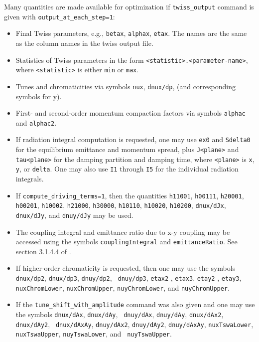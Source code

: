 \documentclass[11pt]{article}
\begin{document}
\begin{itemize}
Many quantities are made available for optimization if \verb|twiss_output| command is given
with \verb|output_at_each_step=1|:
\begin{itemize} 
\item Final Twiss parameters, e.g., \verb|betax|, \verb|alphax|, \verb|etax|.  The names
are the same as the column names in the twiss output file.
\item Statistics of Twiss parameters in the form \verb|<statistic>.<parameter-name>|,
where \verb|<statistic>| is either \verb|min| or \verb|max|.
\item Tunes and chromaticities via symbols \verb|nux|, \verb|dnux/dp|, (and corresponding
symbols for y).
\item First- and second-order momentum compaction factors via symbols \verb|alphac| and \verb|alphac2|.  
\item If radiation integral computation is requested,  one may use \verb|ex0| and \verb|Sdelta0| for
the equilibrium emittance and momentum spread, plus \verb|J<plane>|
and \verb|tau<plane>| for the damping partition and damping time,
where \verb|<plane>| is \verb|x|, \verb|y|, or \verb|delta|.  One may also use
\verb|I1| through \verb|I5| for the individual radiation integrals.
\item If \verb|compute_driving_terms=1|, then the quantities
{\tt h11001}, {\tt h00111}, {\tt h20001}, {\tt h00201}, {\tt h10002}, {\tt h21000}, {\tt h30000}, 
 {\tt h10110}, {\tt h10020}, {\tt h10200}, {\tt dnux/dJx}, {\tt dnux/dJy},  and {\tt dnuy/dJy} 
may be used.
\item The coupling integral and emittance ratio due to x-y coupling may
be accessed using the symbols \verb|couplingIntegral| and
\verb|emittanceRatio|.  See section 3.1.4.4 of \cite{HAPE}.
\item If higher-order chromaticity is requested, then one may use the
  symbols {\tt dnux/dp2}, {\tt dnux/dp3}, {\tt dnuy/dp2}, {\tt
    dnuy/dp3}, {\tt etax2} , {\tt etax3}, {\tt etay2} , {\tt etay3},
  {\tt nuxChromLower}, {\tt nuxChromUpper}, {\tt nuyChromLower}, and
  {\tt nuyChromUpper}.
\item If the \verb|tune_shift_with_amplitude| command was also given
  and one may use the symbols {\tt dnux/dAx}, {\tt dnux/dAy}, {\tt
    dnuy/dAx}, {\tt dnuy/dAy}, {\tt dnux/dAx2}, {\tt dnux/dAy2}, {\tt
    dnux/dAxAy}, {\tt dnuy/dAx2}, {\tt dnuy/dAy2}, {\tt dnuy/dAxAy},
  {\tt nuxTswaLower}, {\tt nuxTswaUpper}, {\tt nuyTswaLower}, and {\tt
    nuyTswaUpper}.

\end{itemize}


\end{itemize}
\end{document}
